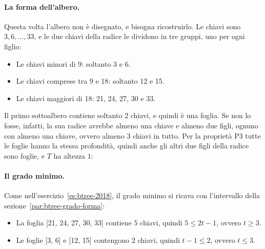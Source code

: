 \paragraph{La forma dell'albero.}
Questa volta l'albero non è disegnato, e bisogna ricostruirlo. Le chiavi sono $3, 6, \ldots, 33$, e le due chiavi della radice le dividono in tre gruppi, uno per ogni figlio:
\begin{itemize}
    \item Le chiavi minori di 9: soltanto 3 e 6.
    \item Le chiavi comprese tra 9 e 18: soltanto 12 e 15.
    \item Le chiavi maggiori di 18: 21, 24, 27, 30 e 33.
\end{itemize}

Il primo sottoalbero contiene soltanto $2$ chiavi, e quindi è una foglia. Se non lo fosse, infatti, la sua radice avrebbe almeno una chiave e almeno due figli, ognuno con almeno una chiave, ovvero almeno $3$ chiavi in tutto. Per la proprietà P3 tutte le foglie hanno la stessa profondità, quindi anche gli altri due figli della radice sono foglie, e $T$ ha altezza $1$:

\begin{center}
\end{center}

\paragraph{Il grado minimo.}
Come nell'esercizio~\ref{es:btree-2018}, il grado minimo si ricava con l'intervallo della sezione~\ref{par:btree-grado-forma}:
\begin{itemize}
    \item La foglia [21, 24, 27, 30, 33] contiene $5$ chiavi, quindi $5 \le 2t-1$, ovvero $t \ge 3$.
    \item Le foglie [3, 6] e [12, 15] contengono $2$ chiavi, quindi $t-1 \le 2$, ovvero $t \le 3$.
\end{itemize}

